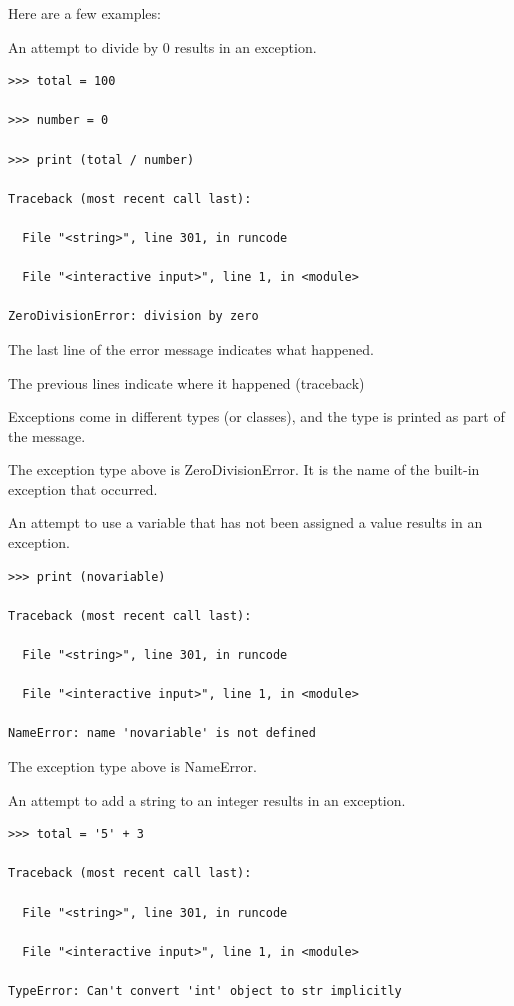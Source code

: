 \documentclass{article}
\begin{document}
Here are a few examples:

An attempt to divide by 0 results in an exception.

\begin{lstlisting}
>>> total = 100

>>> number = 0

>>> print (total / number)

Traceback (most recent call last):

  File "<string>", line 301, in runcode

  File "<interactive input>", line 1, in <module>

ZeroDivisionError: division by zero
\end{lstlisting}

The last line of the error message indicates what happened. 

The previous lines indicate where it happened (traceback)

Exceptions come in different types (or classes), and the type is printed as part of the message.

The exception type above is ZeroDivisionError.  It is the name of the built-in exception that occurred. 

An attempt to use a variable that has not been assigned a value results in an exception.

\begin{lstlisting}
>>> print (novariable)

Traceback (most recent call last):

  File "<string>", line 301, in runcode

  File "<interactive input>", line 1, in <module>

NameError: name 'novariable' is not defined
\end{lstlisting}

The exception type above is NameError. 

An attempt to add a string to an integer results in an exception.

\begin{lstlisting}
>>> total = '5' + 3 

Traceback (most recent call last):

  File "<string>", line 301, in runcode

  File "<interactive input>", line 1, in <module>

TypeError: Can't convert 'int' object to str implicitly
\end{lstlisting}
\end{document}
